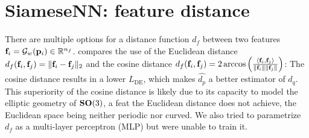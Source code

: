 \section{SiameseNN: feature distance}\label{apx:siamese:feature-distance}


There are multiple options for a distance function $d_f$ between two features $\mathbf{f}_i = \mathcal{G}_w(\mathbf{p}_i) \in \mathbb{R}^{n_f}$.
 compares the use of the Euclidean distance $d_f(\mathbf{f}_i, \mathbf{f}_j) = \Vert \mathbf{f}_i - \mathbf{f}_j \Vert_2$ and the cosine distance $d_f(\mathbf{f}_i, \mathbf{f}_j) = 2 \arccos \left( \frac{\langle \mathbf{f}_i, \mathbf{f}_j \rangle}{\lVert \mathbf{f}_i \rVert \lVert \mathbf{f}_j \rVert} \right)$: The cosine distance results in a lower $L_\text{DE}$, which makes $\widehat{d_p}$ a better estimator of $d_q$.
This superiority of the cosine distance is likely due to its capacity to model the elliptic geometry of $\mathrm{\mathbf{SO}}(3)$, a feat the Euclidean distance does not achieve, the Euclidean space being neither periodic nor curved.
We also tried to parametrize $d_f$ as a multi-layer perceptron (MLP) but were unable to train it.


